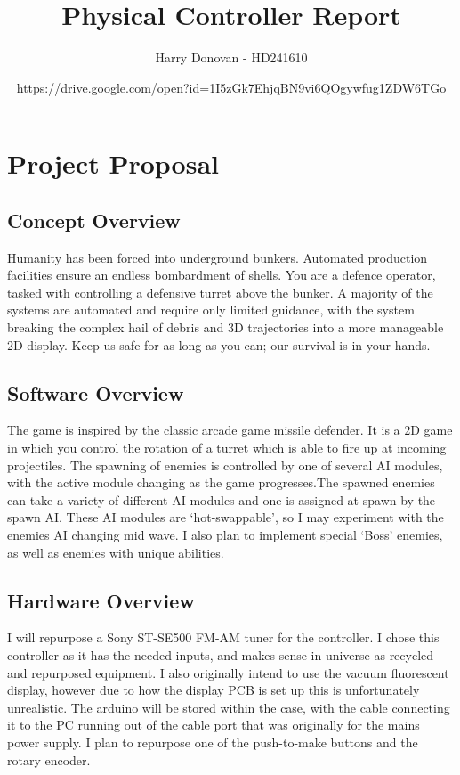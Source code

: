 \documentclass{article}
\title{Physical Controller Report}
\author{Harry Donovan - HD241610}
\date{https://drive.google.com/open?id=1I5zGk7EhjqBN9vi6QOgywfug1ZDW6TGo}
\begin{document}
    \maketitle

    \tableofcontents

    \newpage

    \section{Project Proposal}
        \subsection{Concept Overview}
            Humanity has been forced into underground bunkers. Automated production facilities ensure an endless bombardment of shells. You are a defence operator, tasked with controlling a defensive turret above the bunker. A majority of the systems are automated and require only limited guidance, with the system breaking the complex hail of debris and 3D trajectories into a more manageable 2D display. Keep us safe for as long as you can; our survival is in your hands.

        \subsection{Software Overview}
            The game is inspired by the classic arcade game missile defender. It is a 2D game in which you control the rotation of a turret which is able to fire up at incoming projectiles. The spawning of enemies is controlled by one of several AI modules, with the active module changing as the game progresses.The spawned enemies can take a variety of different AI modules and one is assigned at spawn by the spawn AI. These AI modules are ‘hot-swappable’, so I may experiment with the enemies AI changing mid wave. I also plan to implement special ‘Boss’ enemies, as well as enemies with unique abilities.

        \subsection{Hardware Overview}
            I will repurpose a Sony ST-SE500 FM-AM tuner for the controller. I chose this controller as it has the needed inputs, and makes sense in-universe as recycled and repurposed equipment. I also originally intend to use the vacuum fluorescent display, however due to how the display PCB is set up this is unfortunately unrealistic. The arduino will be stored within the case, with the cable connecting it to the PC running out of the cable port that was originally for the mains power supply. I plan to repurpose one of the push-to-make buttons and the rotary encoder.
    
\end{document}
